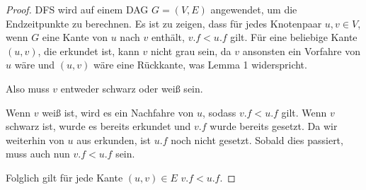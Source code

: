 \documentclass[ngerman,landscape,twocolumn]{adtexsheet}
\begin{document}
\begin{solution}
\begin{enumerate}
        \begin{proof}
        DFS wird auf einem \textsc{DAG} $G=(V, E)$ angewendet, um die Endzeitpunkte zu berechnen. Es ist zu zeigen, dass für jedes Knotenpaar $u, v \in V$, wenn $G$ eine Kante von $u$ nach $v$ enthält, $v.f < u.f$ gilt. Für eine beliebige Kante $(u,v)$, die erkundet ist, kann $v$ nicht grau sein, da $v$ ansonsten ein Vorfahre von $u$ wäre und $(u, v)$ wäre eine Rückkante, was Lemma 1 widerspricht.
        
        Also muss $v$ entweder schwarz oder weiß sein.
        
        Wenn $v$ weiß ist, wird es ein Nachfahre von $u$, sodass $v.f < u.f$ gilt. Wenn $v$ schwarz ist, wurde es bereits erkundet und $v.f$ wurde bereits gesetzt. Da wir weiterhin von $u$ aus erkunden, ist $u.f$ noch nicht gesetzt. Sobald dies passiert, muss auch nun $v.f < u.f$ sein.
        
        Folglich gilt für jede Kante $(u,v) \in E$ $v.f < u.f$. 
        \end{proof}
    
    \end{enumerate}
\end{solution}
\end{document}
